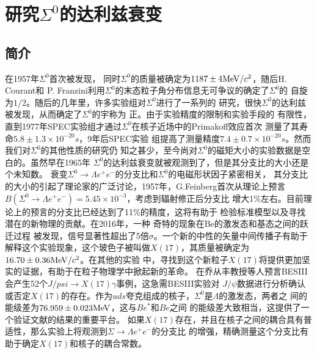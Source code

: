 ﻿%
%
%
\chapter{研究$\Sigma^{0}$的达利兹衰变}
\section{简介}%
\label{sec:introduction-dalitz-decay}
在1957年$\Sigma^{0}$首次被发现\cite{1957:desoh,Plano1957}，
同时$\Sigma^{0}$的质量被确定为$1187 \pm 4{\rm MeV}/c^{2}$，随后H. Courant和
P. Franzini利用$\Sigma^{0}$的末态粒子角分布信息无可争议的确定了$\Sigma^{0}$的
自旋为$1/2$\cite{Plano1957}。随后的几年里，许多实验组对$\Sigma^{0}$进行了一系列的
研究，很快$\Sigma^{0}$的达利兹被发现，从而确定了$\Sigma^{0}$的宇称为
正\cite{Courant:1963zzd,AlffSteinberger:1965zz}。由于实验精度的限制和实验手段的
有限性，直到1977年SPEC实验组才通过$\Sigma^{0}$在核子近场中的Primakoff效应首次
测量了其寿命$5.8\pm 1.3 \times 10^{-20} s$\cite{Dydak:1976dn}，9年后SPEC实验
组提高了测量精度$7.4\pm 0.7 \times 10^{-20}
s$\cite{Petersen:1986fi,Devlin:1986hm}。然而我们对$\Sigma^{0}$的其他性质的研究仍
知之甚少，至今尚对$\Sigma^{0}$的磁矩大小的实验数据是空白的。虽然早在1965年
$\Sigma^{0}$的达利兹衰变就被观测到了，但是其分支比的大小还是个未知数。
衰变$\Sigma^{0}  \to \Lambda e^{+} e^{-}$的分支比和$\Sigma^{0}$的电磁形状因子紧密相关，
其分支比的大小的引起了理论家的广泛讨论\cite{Feinberg:1958zz,Michel:1965zz,Sidhu:1972rx,
Mani:1974wt,Abers:1977dc,Husek:2019wmt}，1957年，G.Feinberg首次从理论上预言
$B(\Sigma^{0} \to \Lambda e^{+} e^{-}) = 5.45 \times 10^{-3}$，考虑到辐射修正后分支比
增大1\%左右\cite{Sidhu:1972rx}。目前理论上的预言的分支比已经达到了11\%的精度，这将有助于
检验标准模型以及寻找潜在的新物理的贡献。在2016年，一种 奇特的现象在Be的激发态和基态之间的跃迁过程
被发现\cite{Krasznahorkay:2015iga}，信号显著性超出了5倍$\sigma$。一个新的中性的矢量中间传播子有助于
解释这个实验现象，这个玻色子被叫做$X(17)$，其质量被确定为$16.70 \pm 0.36 {\rm MeV}/c^{2}$。在其他的实验
中，寻找到这个新粒子$X(17)$将提供更加坚实的证据，有助于在粒子物理学中掀起新的革命。
在乔从丰教授等人预言\cite{Jiang:2018uhs}BESIII会产生52个$J/psi \to X(17) \gamma$事例，这急需BESIII实验对
$J/\psi$数据进行分析确认或否定$X(17)$的存在。作为$uds$夸克组成的核子，$\Sigma^{0}$是$\Lambda$的激发态，两者之
间的能级差为$76.959 \pm 0.023 {\rm MeV}$，这与$Be^{*}$和$Be$之间
的能级差大致相当，这提供了一个验证文献\cite{Krasznahorkay:2015iga}的结果的重要平台。
如果$X(17)$存在，并且在核子之间的耦合具有普适性，那么实验上将观测到$\Sigma \to \Lambda e^{+} e^{-}$的分支比
的增强，精确测量这个分支比有助于确定$X(17)$和核子的耦合常数。

